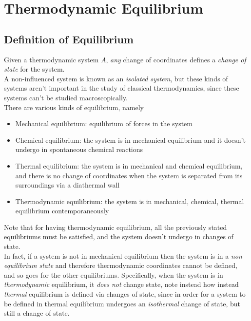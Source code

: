 \documentclass[../qm.tex]{subfiles}
\begin{document}
\section{Thermodynamic Equilibrium}
\subsection{Definition of Equilibrium}
Given a thermodynamic system $A$, \textit{any} change of coordinates defines a \textit{change of state} for the system.\\
A non-influenced system is known as an \textit{isolated system}, but these kinds of systems aren't important in the study of classical thermodynamics, since these systems can't be studied macroscopically.\\
There are various kinds of equilibrium, namely
\begin{itemize}
\item Mechanical equilibrium: equilibrium of forces in the system
\item Chemical equilibrium: the system is in mechanical equilibrium and it doesn't undergo in spontaneous chemical reactions
\item Thermal equilibrium: the system is in mechanical and chemical equilibrium, and there is no change of coordinates when the system is separated from its surroundings via a diathermal wall
\item Thermodynamic equilibrium: the system is in mechanical, chemical, thermal equilibrium contemporaneously
\end{itemize}
Note that for having thermodynamic equilibrium, all the previously stated equilibriums must be satisfied, and the system doesn't undergo in changes of state.\\
In fact, if a system is not in mechanical equilibrium then the system is in a \textit{non equilibrium state} and therefore thermodynamic coordinates cannot be defined, and so goes for the other equilibriums. Specifically, when the system is in \textit{thermodynamic} equilibrium, it \textit{does not} change state, note instead how instead \textit{thermal} equilibrium is defined via changes of state, since in order for a system to be defined in thermal equilibrium undergoes an \textit{isothermal} change of state, but still a change of state.
\end{document}
